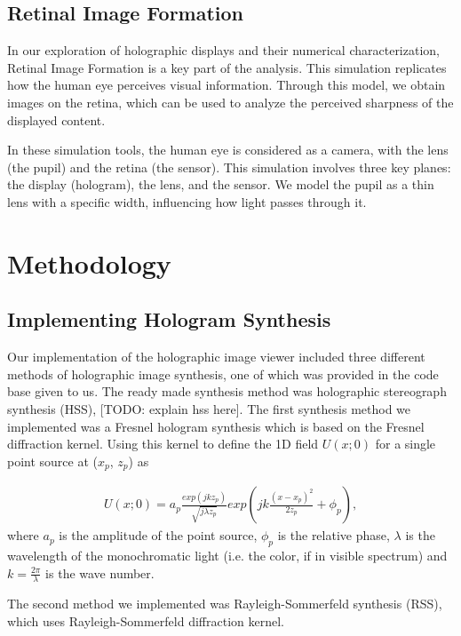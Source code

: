 \documentclass[12pt,a4paper,english
]{tunithesis}
\begin{document}
\section{Retinal Image Formation}
In our exploration of holographic displays and their numerical characterization, Retinal Image Formation is a key part of the analysis. This simulation replicates how the human eye perceives visual information. Through this model, we obtain images on the retina, which can be used to analyze the perceived sharpness of the displayed content.

In these simulation tools, the human eye is considered as a camera, with the lens (the pupil) and the retina (the sensor). This simulation involves three key planes: the display (hologram), the lens, and the sensor. We model the pupil as a thin lens with a specific width, influencing how light passes through it.



\chapter{Methodology}
\label{sec:methodology}

\section{Implementing Hologram Synthesis}
Our implementation of the holographic image viewer included three different methods of holographic image synthesis, one of which was provided in the code base given to us. The ready made synthesis method was holographic stereograph synthesis (HSS), [TODO: explain hss here]. The first synthesis method we implemented was a Fresnel hologram synthesis which is based on the Fresnel diffraction kernel. Using this kernel to define the 1D field $U(x;0)$ for a single point source at  ($x_p$, $z_p$) as

\begin{align}
  \label{eq:field}
  U(x;0) = a_p\frac{exp(j k z_p)}{\sqrt{j \lambda z_p}}exp(jk\frac{(x-x_p)^2}{2z_p}+\phi_p),
\end{align}
where $a_p$ is the amplitude of the point source, $\phi_p$ is the relative phase, $\lambda$ is the wavelength of the monochromatic light (i.e. the color, if in visible spectrum) and $k = \frac{2\pi}{\lambda}$ is the wave number.

The second method we implemented was Rayleigh-Sommerfeld synthesis (RSS), which uses Rayleigh-Sommerfeld diffraction kernel. 
\end{document}
